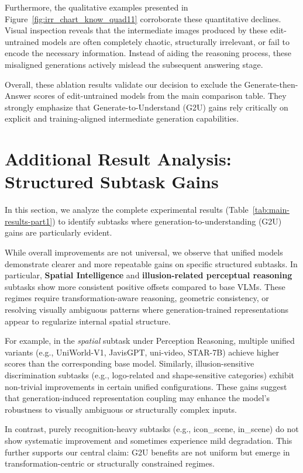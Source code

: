 \documentclass{article}
\theoremstyle{plain}
\theoremstyle{definition}
\theoremstyle{remark}
\begin{document}
Furthermore, the qualitative examples presented in Figure~\ref{fig:irr_chart_know_quad11} corroborate these quantitative declines. Visual inspection reveals that the intermediate images produced by these edit-untrained models are often completely chaotic, structurally irrelevant, or fail to encode the necessary information. Instead of aiding the reasoning process, these misaligned generations actively mislead the subsequent answering stage.

Overall, these ablation results validate our decision to exclude the Generate-then-Answer scores of edit-untrained models from the main comparison table. They strongly emphasize that Generate-to-Understand (G2U) gains rely critically on explicit and training-aligned intermediate generation capabilities.

\section{Additional Result Analysis: Structured Subtask Gains}
\label{sec:appendix_subtask_analysis}

In this section, we analyze the complete experimental results (Table~\ref{tab:main-results-part1}) to identify subtasks where generation-to-understanding (G2U) gains are particularly evident.

While overall improvements are not universal, we observe that unified models demonstrate clearer and more repeatable gains on specific structured subtasks. In particular, \textbf{Spatial Intelligence} and \textbf{illusion-related perceptual reasoning} subtasks show more consistent positive offsets compared to base VLMs. These regimes require transformation-aware reasoning, geometric consistency, or resolving visually ambiguous patterns where generation-trained representations appear to regularize internal spatial structure.

For example, in the \textit{spatial} subtask under Perception Reasoning, multiple unified variants (e.g., UniWorld-V1, JavisGPT, uni-video, STAR-7B) achieve higher scores than the corresponding base model. Similarly, illusion-sensitive discrimination subtasks (e.g., logo-related and shape-sensitive categories) exhibit non-trivial improvements in certain unified configurations. These gains suggest that generation-induced representation coupling may enhance the model’s robustness to visually ambiguous or structurally complex inputs.

In contrast, purely recognition-heavy subtasks (e.g., icon\_scene, in\_scene) do not show systematic improvement and sometimes experience mild degradation. This further supports our central claim: G2U benefits are not uniform but emerge in transformation-centric or structurally constrained regimes.
\end{document}
